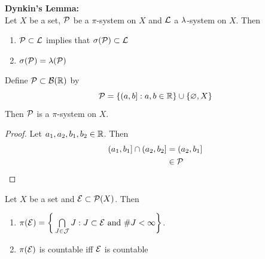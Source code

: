 \documentclass{book}
\begin{document}
	\begin{thm}  \textbf{Dynkin's Lemma:} \\
		Let $X$ be a set, $\mathcal{P}$ be a $\pi$-system on $X$ and $\mathcal{L}$ a $\lambda$-system on $X$. Then
		\begin{enumerate}
			\item $\mathcal{P} \subset \mathcal{L}$ implies that $\sigma(\mathcal{P}) \subset \mathcal{L}$ 
			\item $\sigma(\mathcal{P}) = \lambda(\mathcal{P})$
		\end{enumerate} 
	\end{thm}
	
	\begin{ex} 
		Define $\mathcal{P} \subset \mathcal{B}(\mathbb{R})$ by $$\mathcal{P} = \{(a,b]: a,b \in \mathbb{R}\} \cup \{\varnothing, X\}$$
		Then $\mathcal{P}$ is a $\pi$-system on $X$.
	\end{ex}

	\begin{proof}
		Let $a_1, a_2, b_1, b_2 \in \mathbb{R}$. Then 
		\begin{align*}
			(a_1, b_1] \cap (a_2, b_2] 
			& = (a_2, b_1] \\
			& \in \mathcal{P}
		\end{align*} 
	\end{proof}
	
	\begin{ex}  
		Let $X$ be a set and $\mathcal{E} \subset \mathcal{P}(X)$. Then 
		\begin{enumerate}
			\item $\pi(\mathcal{E}) =  \bigg \{ \bigcap\limits_{J \in \mathcal{J}}J: \text{$J \subset \mathcal{E}$ and $\# J < \infty$}  \bigg\}$.
			\item $\pi(\mathcal{E})$ is countable iff $\mathcal{E}$ is countable
		\end{enumerate}
	\end{ex}
	
\end{document}
